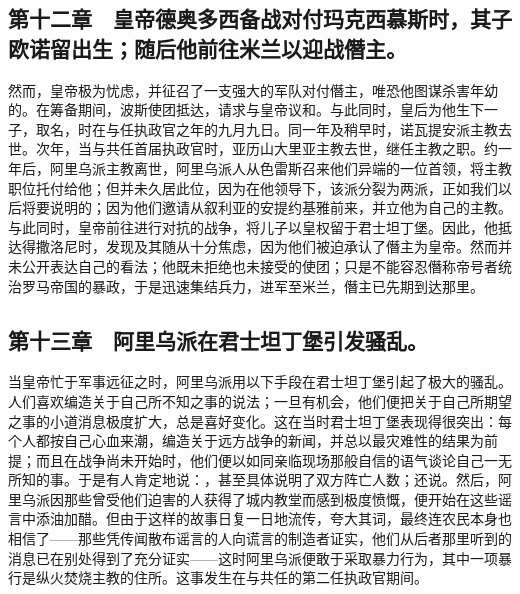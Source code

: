 
\subsection{第十二章　皇帝德奥多西备战对付玛克西慕斯时，其子欧诺留出生；随后他前往米兰以迎战僭主。}

然而，皇帝极为忧虑，并征召了一支强大的军队对付僭主，唯恐他图谋杀害年幼的。在筹备期间，波斯使团抵达，请求与皇帝议和。与此同时，皇后为他生下一子，取名，时在与任执政官之年的九月九日。同一年及稍早时，诺瓦提安派主教去世。次年，当与共任首届执政官时，亚历山大里亚主教去世，继任主教之职。约一年后，阿里乌派主教离世，阿里乌派人从色雷斯召来他们异端的一位首领，将主教职位托付给他；但并未久居此位，因为在他领导下，该派分裂为两派，正如我们以后将要说明的；因为他们邀请从叙利亚的安提约基雅前来，并立他为自己的主教。与此同时，皇帝前往进行对抗的战争，将儿子以皇权留于君士坦丁堡。因此，他抵达得撒洛尼时，发现及其随从十分焦虑，因为他们被迫承认了僭主为皇帝。然而并未公开表达自己的看法；他既未拒绝也未接受的使团；只是不能容忍僭称帝号者统治罗马帝国的暴政，于是迅速集结兵力，进军至米兰，僭主已先期到达那里。\par


\subsection{第十三章　阿里乌派在君士坦丁堡引发骚乱。}

当皇帝忙于军事远征之时，阿里乌派用以下手段在君士坦丁堡引起了极大的骚乱。人们喜欢编造关于自己所不知之事的说法；一旦有机会，他们便把关于自己所期望之事的小道消息极度扩大，总是喜好变化。这在当时君士坦丁堡表现得很突出：每个人都按自己心血来潮，编造关于远方战争的新闻，并总以最灾难性的结果为前提；而且在战争尚未开始时，他们便以如同亲临现场那般自信的语气谈论自己一无所知的事。于是有人肯定地说：，甚至具体说明了双方阵亡人数；还说。然后，阿里乌派因那些曾受他们迫害的人获得了城内教堂而感到极度愤慨，便开始在这些谣言中添油加醋。但由于这样的故事日复一日地流传，夸大其词，最终连农民本身也相信了——那些凭传闻散布谣言的人向谎言的制造者证实，他们从后者那里听到的消息已在别处得到了充分证实——这时阿里乌派便敢于采取暴力行为，其中一项暴行是纵火焚烧主教的住所。这事发生在与共任的第二任执政官期间。\par

